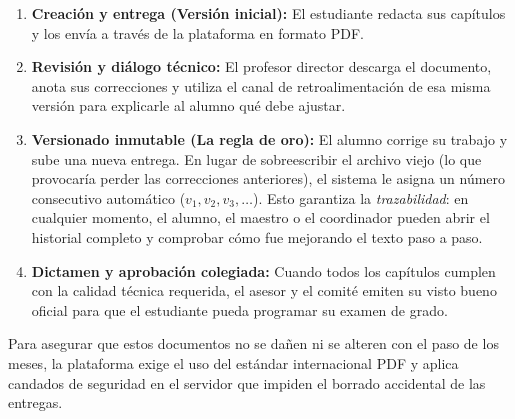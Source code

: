 \begin{enumerate}
    \item \textbf{Creación y entrega (Versión inicial):} El estudiante redacta sus capítulos y los envía a través de la plataforma en formato PDF.
    \item \textbf{Revisión y diálogo técnico:} El profesor director descarga el documento, anota sus correcciones y utiliza el canal de retroalimentación de esa misma versión para explicarle al alumno qué debe ajustar.
    \item \textbf{Versionado inmutable (La regla de oro):} El alumno corrige su trabajo y sube una nueva entrega. En lugar de sobreescribir el archivo viejo (lo que provocaría perder las correcciones anteriores), el sistema le asigna un número consecutivo automático ($v_1, v_2, v_3, \dots$). Esto garantiza la \textit{trazabilidad}: en cualquier momento, el alumno, el maestro o el coordinador pueden abrir el historial completo y comprobar cómo fue mejorando el texto paso a paso.
    \item \textbf{Dictamen y aprobación colegiada:} Cuando todos los capítulos cumplen con la calidad técnica requerida, el asesor y el comité emiten su visto bueno oficial para que el estudiante pueda programar su examen de grado.
\end{enumerate}

Para asegurar que estos documentos no se dañen ni se alteren con el paso de los meses, la plataforma exige el uso del estándar internacional PDF y aplica candados de seguridad en el servidor que impiden el borrado accidental de las entregas.